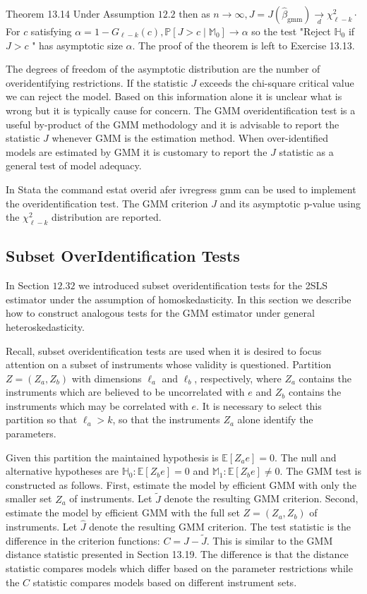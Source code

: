\documentclass[10pt]{article}
\begin{document}
Theorem 13.14 Under Assumption $12.2$ then as $n \rightarrow \infty, J=J\left(\widehat{\beta}_{\mathrm{gmm}}\right) \underset{d}{\rightarrow} \chi_{\ell-k}^{2} \cdot$ For $c$ satisfying $\alpha=1-G_{\ell-k}(c), \mathbb{P}\left[J>c \mid \mathbb{M}_{0}\right] \longrightarrow \alpha$ so the test "Reject $\mathbb{H}_{0}$ if $J>c$ " has asymptotic size $\alpha$. The proof of the theorem is left to Exercise 13.13.

The degrees of freedom of the asymptotic distribution are the number of overidentifying restrictions. If the statistic $J$ exceeds the chi-square critical value we can reject the model. Based on this information alone it is unclear what is wrong but it is typically cause for concern. The GMM overidentification test is a useful by-product of the GMM methodology and it is advisable to report the statistic $J$ whenever GMM is the estimation method. When over-identified models are estimated by GMM it is customary to report the $J$ statistic as a general test of model adequacy.

In Stata the command estat overid afer ivregress gmm can be used to implement the overidentification test. The GMM criterion $J$ and its asymptotic $\mathrm{p}$-value using the $\chi_{\ell-k}^{2}$ distribution are reported.

\subsection{Subset OverIdentification Tests}
In Section $12.32$ we introduced subset overidentification tests for the 2SLS estimator under the assumption of homoskedasticity. In this section we describe how to construct analogous tests for the GMM estimator under general heteroskedasticity.

Recall, subset overidentification tests are used when it is desired to focus attention on a subset of instruments whose validity is questioned. Partition $Z=\left(Z_{a}, Z_{b}\right)$ with dimensions $\ell_{a}$ and $\ell_{b}$, respectively, where $Z_{a}$ contains the instruments which are believed to be uncorrelated with $e$ and $Z_{b}$ contains the instruments which may be correlated with $e$. It is necessary to select this partition so that $\ell_{a}>k$, so that the instruments $Z_{a}$ alone identify the parameters.

Given this partition the maintained hypothesis is $\mathbb{E}\left[Z_{a} e\right]=0$. The null and alternative hypotheses are $\mathbb{H}_{0}: \mathbb{E}\left[Z_{b} e\right]=0$ and $\mathbb{M}_{1}: \mathbb{E}\left[Z_{b} e\right] \neq 0$. The GMM test is constructed as follows. First, estimate the model by efficient GMM with only the smaller set $Z_{a}$ of instruments. Let $\widetilde{J}$ denote the resulting GMM criterion. Second, estimate the model by efficient GMM with the full set $Z=\left(Z_{a}, Z_{b}\right)$ of instruments. Let $\widehat{J}$ denote the resulting GMM criterion. The test statistic is the difference in the criterion functions: $C=\widehat{J}-\widetilde{J}$. This is similar to the GMM distance statistic presented in Section 13.19. The difference is that the distance statistic compares models which differ based on the parameter restrictions while the $C$ statistic compares models based on different instrument sets.
\end{document}
